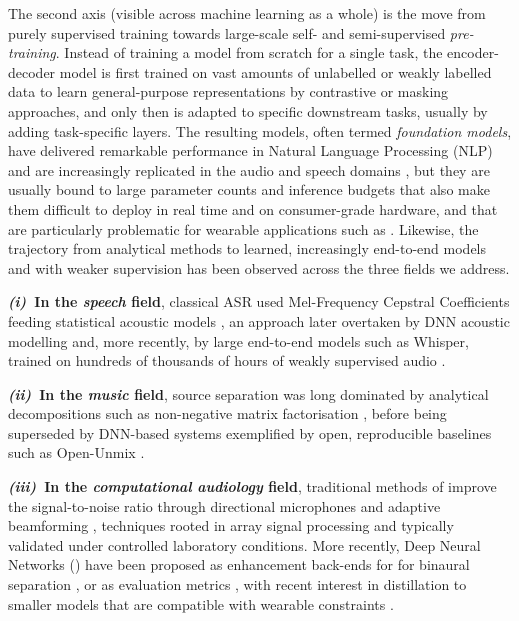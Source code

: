 The second axis (visible across machine learning as a whole) is the move from purely supervised training towards large-scale self- and semi-supervised \emph{pre-training}. Instead of training a model from scratch for a single task, the encoder-decoder model is first trained on vast amounts of unlabelled or weakly labelled data to learn general-purpose representations by contrastive or masking approaches, and only then is adapted to specific downstream tasks, usually by adding task-specific layers. The resulting models, often termed \emph{foundation models}, have delivered remarkable performance in Natural Language Processing (NLP) \citep{devlin2019bert, touvron2023llama} and are increasingly replicated in the audio and speech domains \citep{baevski2020wav2vec2, mohamed2022ssl}, but they are usually bound to large parameter counts and inference budgets that also make them difficult to deploy in real time and on consumer-grade hardware, and that are particularly problematic for wearable applications such as . Likewise, the trajectory from analytical methods to learned, increasingly end-to-end models and with weaker supervision has been observed across the three fields we address. 

\textbf{\textit{(i)}~In the \emph{speech} field}, classical \acrfull{ASR} used Mel-Frequency Cepstral Coefficients \citep{davis1980mfcc} feeding statistical
acoustic models \citep{rabiner1989tutorial}, an approach later overtaken by \acrshort{DNN} acoustic modelling
\citep{hinton2012} and, more recently, by large end-to-end models such as
Whisper, trained on hundreds of thousands of hours of weakly supervised audio
\citep{radford2022whisper}. 

\textbf{\textit{(ii)}~In the \emph{music} field}, source separation was long
dominated by analytical decompositions such as non-negative matrix
factorisation \citep{virtanen2007nmf}, before being superseded by \acrshort{DNN}-based
systems exemplified by open, reproducible baselines such as Open-Unmix \citep{stoter2019openunmix}. 

\textbf{\textit{(iii)}~In the \emph{computational audiology} field}, traditional methods of  improve the signal-to-noise ratio through directional microphones and adaptive beamforming
\citep{ricketts1999, gode2022}, techniques rooted in array signal processing
and typically validated under controlled laboratory conditions. More recently,
Deep Neural Networks () have been proposed as enhancement back-ends for
 for binaural separation \citep{han2020}, or as evaluation metrics \citep{chiang2024multi}, with recent interest in distillation to smaller models that are compatible with wearable constraints
\citep{wang2023neural, andersen2021}.



